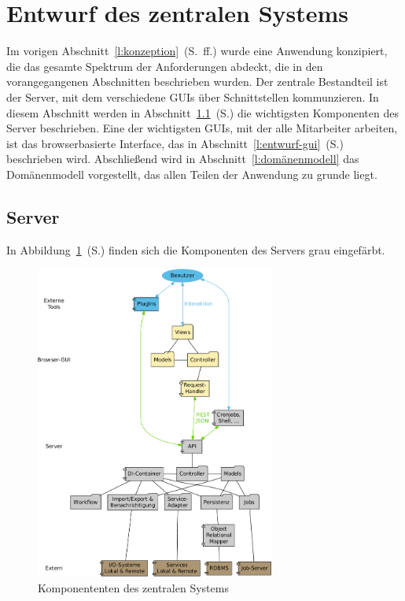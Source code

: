 \section{Entwurf des zentralen Systems}\label{l:entwurf}

Im vorigen Abschnitt~\ref{l:konzeption}~(S.\pageref{l:konzeption}~ff.) wurde eine Anwendung konzipiert, die das gesamte Spektrum der Anforderungen abdeckt, die in den vorangegangenen Abschnitten beschrieben wurden. Der zentrale Bestandteil ist der Server, mit dem verschiedene GUIs über Schnittstellen kommunzieren. In diesem Abschnitt werden in Abschnitt~\ref{l:entwurf-server}~(S.\pageref{l:entwurf-server}) die wichtigsten Komponenten des Server beschrieben. Eine der wichtigsten GUIs, mit der alle Mitarbeiter arbeiten, ist das browserbasierte Interface, das in Abschnitt~\ref{l:entwurf-gui}~(S.\pageref{l:entwurf-gui}) beschrieben wird. Abschließend wird in Abschnitt~\ref{l:domänenmodell} das Domänenmodell vorgestellt, das allen Teilen der Anwendung zu grunde liegt.

\subsection{Server}\label{l:entwurf-server}

In Abbildung~\ref{chart:komponenten}~(S.\pageref{chart:komponenten}) finden sich die Komponenten des Servers grau eingefärbt.

\begin{figure}[htb]
\begin{center}
\includegraphics[width=0.7\textwidth]{media/komponenten.pdf}
\end{center}
\caption{Komponententen des zentralen Systems}
\label{chart:komponenten}
\end{figure}

